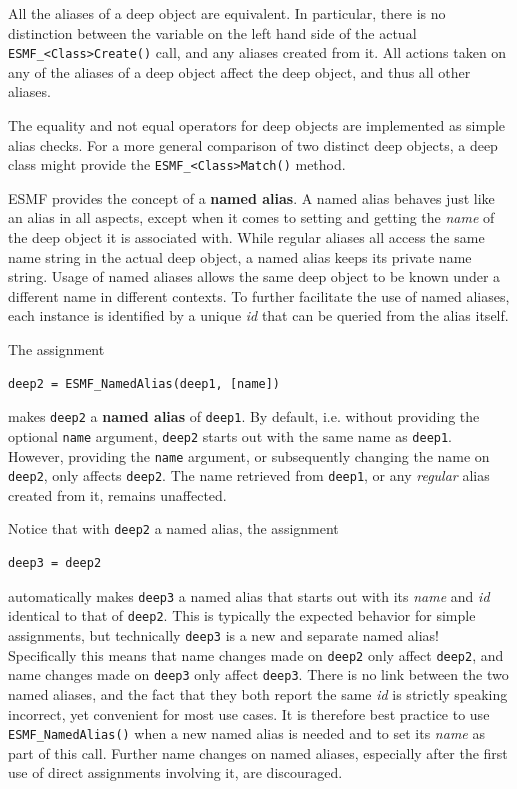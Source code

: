 All the aliases of a deep object are equivalent. In particular, there is no
distinction between the variable on the left hand side of the actual
{\tt ESMF\_<Class>Create()} call, and any aliases created from it. All actions
taken on any of the aliases of a deep object affect the deep object, and thus
all other aliases.

The equality and not equal operators for deep objects are implemented as simple
alias checks. For a more general comparison of two distinct deep objects, a
deep class might provide the {\tt ESMF\_<Class>Match()} method.

ESMF provides the concept of a {\bf named alias}. A named alias behaves just
like an alias in all aspects, except when it comes to setting and getting the
{\em name} of the deep object it is associated with. While regular aliases
all access the same name string in the actual deep object, a named alias keeps
its private name string. Usage of named aliases allows the same deep object to
be known under a different name in different contexts. To further facilitate the
use of named aliases, each instance is identified by a unique {\em id} that can
be queried from the alias itself.

The assignment
\begin{verbatim}
deep2 = ESMF_NamedAlias(deep1, [name])
\end{verbatim}
makes {\tt deep2} a {\bf named alias} of {\tt deep1}. By default, i.e. without
providing the optional {\tt name} argument, {\tt deep2} starts out with the
same name as {\tt deep1}. However, providing the {\tt name} argument, or
subsequently changing the name on {\tt deep2}, only affects {\tt deep2}.
The name retrieved from {\tt deep1}, or any {\em regular} alias created from it,
remains unaffected.

Notice that with {\tt deep2} a named alias, the assignment
\begin{verbatim}
deep3 = deep2
\end{verbatim}
automatically makes {\tt deep3} a named alias that starts out with
its {\em name} and {\em id} identical to that of {\tt deep2}. This is typically
the expected behavior for simple assignments, but technically {\tt deep3} is a
new and separate named alias! Specifically this means that name changes made on
{\tt deep2} only affect {\tt deep2}, and name changes made on {\tt deep3} only
affect {\tt deep3}. There is no link between the two named aliases, and the fact
that they both report the same {\em id} is strictly speaking incorrect, yet
convenient for most use cases. It is therefore best practice to use
{\tt ESMF\_NamedAlias()} when a new named alias is needed and to set its
{\em name} as part of this call. Further name changes on named aliases,
especially after the first use of direct assignments involving it, are
discouraged.


